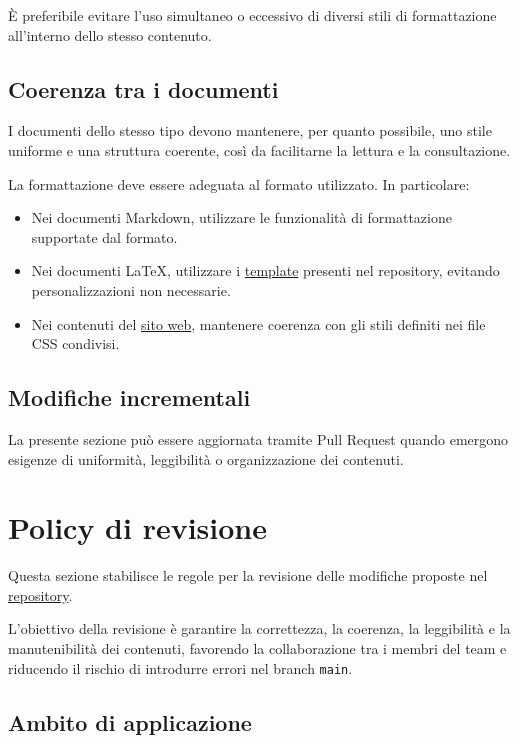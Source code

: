 \documentclass[11pt, a4paper]{article}
\begin{document}
\noindent È preferibile evitare l'uso simultaneo o eccessivo di diversi stili di formattazione all'interno dello stesso contenuto.

\subsection{Coerenza tra i documenti}

I documenti dello stesso tipo devono mantenere, per quanto possibile, uno stile uniforme e una struttura coerente, così da facilitarne la lettura e la consultazione.

La formattazione deve essere adeguata al formato utilizzato. In particolare:
\begin{itemize}
    \item Nei documenti Markdown, utilizzare le funzionalità di formattazione supportate dal formato.
    \item Nei documenti LaTeX, utilizzare i \href{https://github.com/On-By-One-Team/On-By-One.github.io/tree/main/docs/tex/templates}{template} presenti nel repository, evitando personalizzazioni non necessarie.
    \item Nei contenuti del \href{https://on-by-one-team.github.io/On-By-One.github.io/}{sito web}, mantenere coerenza con gli stili definiti nei file CSS condivisi.
\end{itemize}

\subsection{Modifiche incrementali}

La presente sezione può essere aggiornata tramite Pull Request quando emergono esigenze di uniformità, leggibilità o organizzazione dei contenuti.

\section{Policy di revisione}

Questa sezione stabilisce le regole per la revisione delle modifiche proposte nel \href{https://github.com/On-By-One-Team/On-By-One.github.io}{repository}.

L'obiettivo della revisione è garantire la correttezza, la coerenza, la leggibilità e la manutenibilità dei contenuti, favorendo la collaborazione tra i membri del team e riducendo il rischio di introdurre errori nel branch \texttt{main}.

\subsection{Ambito di applicazione}
\end{document}

